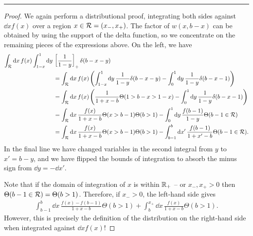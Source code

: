 \begin{subappendices}
\begin{example}{}
\vspace{7pt}
\hrule
\vspace{7pt}

\begin{proof}
    We again perform a distributional proof, integrating both sides against \(\dd x f(x)\) over a region \(x \in \mathcal{R} = (x_-, x_+)\).
    The factor of \(w(x,b-x)\) can be obtained by using the support of the delta function, so we concentrate on the remaining pieces of the expressions above.
    On the left, we have
    \begin{align}
        \int_{\mathcal{R}} \dd x\, f(x)
        \int_{1-x}^{1} \dd y\,&
        \left[\frac{1}{1-y}\right]_+ \delta(b - x - y)
        \\
        &=
        \notag
        \int_{\mathcal{R}} \dd x\,f(x)
        \left(
            \int_{1-x}^{1} \dd y\,
            \frac{1}{1-y}
            \delta(b - x - y)
            -
            \int_0^1 \dd y\,
            \frac{1}{1-y}
            \delta(b - x - 1)
        \right)
        \\
        &=
        \notag
        \int_{\mathcal{R}} \dd x\,f(x)
        \left(
            \frac{1}{1+x-b}
            \Theta(1 > b - x > 1 - x)
            -
            \int_0^{1} \dd y\,
            \frac{1}{1-y}
            \delta(b - x - 1)
        \right)
        \\
        &=
        \notag
        \int_{\mathcal{R}} \dd x\,\frac{f(x)}{1 + x - b}
        \Theta(x > b - 1)\Theta(b > 1)
        -
        \int_0^1 \dd y\,\frac{f(b-1)}{1-y}
        \Theta(b-1 \in \mathcal{R})
        \\
        &=
        \notag
        \int_{\mathcal{R}} \dd x\,\frac{f(x)}{1 + x - b}
        \Theta(x > b - 1)\Theta(b > 1)
        -
        \int_{b-1}^b \dd x'\,\frac{f(b-1)}{1+x'-b}
        \Theta(b-1 \in \mathcal{R})
        .
    \end{align}
    In the final line we have changed variables in the second integral from \(y\) to \(x' = b - y\), and we have flipped the bounds of integration to absorb the minus sign from \(\dd y = -\dd x'\).

    Note that if the domain of integration of \(x\) is within \(\mathbb R_+\) -- or \(x_-, x_+ > 0\) then \(\Theta(b-1 \in \mathcal{R}) = \Theta(b > 1)\).
    Therefore, if \(x_- > 0\), the left-hand side gives
    \begin{align}
        \int_{b-1}^b \dd x\,\frac{f(x) - f(b-1)}{1+x-b}
        \Theta(b > 1)
        +
        \int_b^{x_+} \dd x\,\frac{f(x)}{1+x-b}
        \Theta(b > 1)
        .
    \end{align}
    However, this is precisely the definition of the distribution on the right-hand side when integrated against \(\dd x f(x)\)!
\end{proof}
\end{example}




\end{subappendices}
